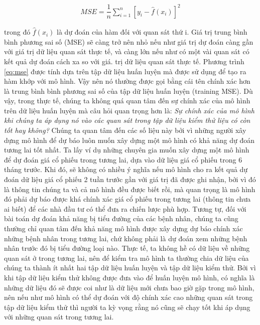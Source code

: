\documentclass[
]{article}
\begin{document}
\begin{align}
MSE = \dfrac{1}{n} \sum\limits_{i = 1}^{n} \left[y_i - \hat{f}(x_i)\right]^2
\label{eq:mse}
\end{align}

trong đó \(\hat{f}(x_i)\) là dự đoán của hàm  đối với quan sát thứ i. Giá trị trung bình bình phương sai số (MSE) sẽ càng trở nên nhỏ nếu như giá trị dự đoán càng gần với giá trị dữ liệu quan sát thực tế, và càng lớn nếu như có một vài quan sát có kết quả dự đoán cách xa so với giá. trị dữ liệu quan sát thực tế. Phương trình \eqref{eq:mse} được tính dựa trên tập dữ liệu huấn luyện mà được sử dụng để tạo ra hàm  khớp với mô hình. Vậy nên nó thường được gọi bằng cái tên chính xác hơn là trung bình bình phương sai số của tập dữ liệu huấn luyện (training MSE). Dù vậy, trong thực tế, chúng ta không quá quan tâm đến sự chính xác của mô hình trên dữ liệu huấn luyện mà câu hỏi quan trọng hơn là: \emph{Sự chính xác của mô hình khi chúng ta áp dụng nó vào các quan sát trong tập dữ liệu kiểm thử liệu có còn tốt hay không?}
Chúng ta quan tâm đến các số liệu này bởi vì những người xây dựng mô hình để dự báo luôn muốn xây dựng một mô hình có khả năng dự đoán tương lai tốt nhất. Ta lấy ví dụ những chuyên gia muốn xây dựng một mô hình để dự đoán giá cổ phiếu trong tương lai, dựa vào dữ liệu giá cổ phiếu trong 6 tháng trước. Khi đó, sẽ không có nhiều ý nghĩa nếu mô hình cho ra kết quả dự đoán dữ liệu giá cổ phiếu 2 tuần trước gần với giá trị đã được ghi nhận, bởi vì đó là thông tin chúng ta và cả mô hình đều được biết rồi, mà quan trọng là mô hình đó phải dự báo được khá chính xác giá cổ phiếu trong tương lai (thông tin chưa ai biết) để các nhà đầu tư có thể đưa ra chiến lược phù hợp. Tương tự, đối với bài toán dự đoán khả năng bị tiểu đường của các bệnh nhân, chúng ta cũng thường chỉ quan tâm đến khả năng mô hình được xây dựng dự báo chính xác những bệnh nhân trong tương lai, chứ không phải là dự đoán xem những bệnh nhân trước đó bị tiểu đường loại nào. Thực tế, ta không hề có dữ liệu về những quan sát ở trong tương lai, nên để kiểm tra mô hình ta thường chia dữ liệu của chúng ta thành ít nhất hai tập dữ liệu huấn luyện và tập dữ liệu kiểm thử. Bởi vì khi tập dữ liệu kiểm thử không được đưa vào để huấn luyện mô hình, có nghĩa là những dữ liệu đó sẽ được coi như là dữ liệu mới chưa bao giờ gặp trong mô hình, nên nếu như mô hình có thể dự đoán với độ chính xác cao những quan sát trong tập dữ liệu kiểm thử thì người ta kỳ vọng rằng nó cũng sẽ chạy tốt khi áp dụng với những quan sát trong tương lai.
\end{document}
